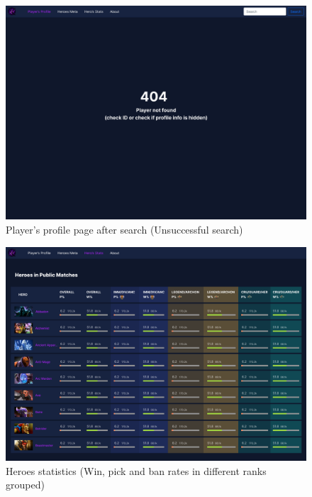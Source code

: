     \begin{figure}[ht]
        \centering
        \includegraphics[width=\textwidth]{images/PlayerNotFound}
        \caption{Player's profile page after search (Unsuccessful search)}
    \end{figure}

    \begin{figure}[ht]
        \centering
        \includegraphics[width=\textwidth]{images/HeroStats}
        \caption{Heroes statistics (Win, pick and ban rates in different ranks grouped)}
    \end{figure}

